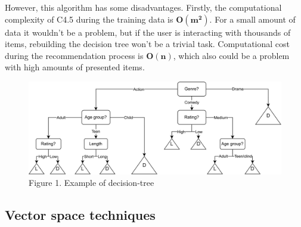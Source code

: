 However, this algorithm has some disadvantages. Firstly, the computational complexity of C4.5 during the training data is $\mathbf{O(m^2)}$. For a small amount of data it wouldn't be a problem, but if the user is interacting with thousands of items, rebuilding the decision tree won't be a trivial task. Computational cost during the recommendation process is $\mathbf{O(n)}$, which also could be a problem with high amounts of presented items\cite{Decision_Tree}.
\begin{center}
    \begin{figure}[H]
    \includegraphics[width=\textwidth]{figures/diagrams/article_decision_tree.pdf}
    \caption{Figure 1. Example of decision-tree}
    \label{fig:decision_tree}
    \end{figure}
\end{center}

\subsection{Vector space techniques}